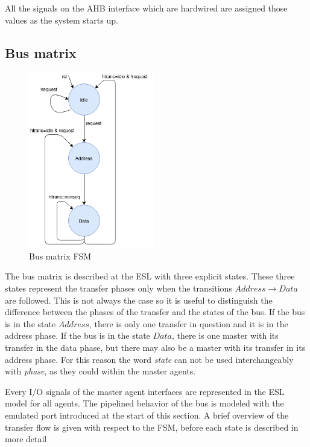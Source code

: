 All the signals on the AHB interface which are hardwired are assigned those values as the system starts up. 

\subsection{Bus matrix}
\label{sub:bus-matrix}
\begin{figure}
\includegraphics[width=5.5cm]{figs/ESL/Bus_fsm_new.png}
\caption{Bus matrix FSM}\label{fig:busfsm}
\end{figure}
The bus matrix is described at the ESL with three explicit states. These three states represent the transfer phases only when the transitions $Address\rightarrow Data$ are followed. This is not always the case so it is useful to distinguish the difference between the phases of the transfer and the states of the bus. If the bus is in the state $Address$, there is only one transfer in question and it is in the address phase. If the bus is in the state $Data$, there is one master with its transfer in the data phase, but there may also be a master with its transfer in its address phase. For this reason the word \textit{state} can not be used interchangeably with \textit{phase}, as they could within the master agents.\par
Every I/O signals of the master agent interfaces are represented in the ESL model for all agents. The pipelined behavior of the bus is modeled with the emulated port introduced at the start of this section. A brief overview of the transfer flow is given with respect to the FSM, before each state is described in more detail \par

